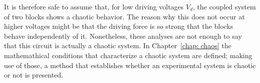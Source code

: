 It is therefore safe to assume that, for low driving voltages $V_d$, the coupled system of two blocks shows a chaotic behavior.
The reason why this does not occur at higher voltages might be that the driving force is so strong that the blocks
behave independently of it. Nonetheless, these analyses are not enough to say that this circuit is actually a chaotic system.
In Chapter~\ref{chap: chaos} the mathemathical conditions that characterize
a chaotic system are defined; making use of those, a method that establishes whether an experimental
system is chaotic or not is presented.




